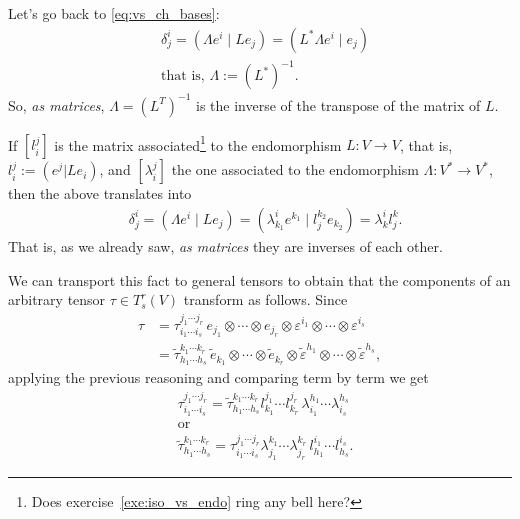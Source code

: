 Let's go back to \eqref{eq:vs_ch_bases}:
\begin{align}
	 & \delta_j^i = (\Lambda e^i \mid L e_j) = (L^* \Lambda e^i \mid e_j) \\
	 & \mbox{that is, } \Lambda := (L^*)^{-1}.
\end{align}
So, \emph{as matrices}, $\Lambda = (L^T)^{-1}$ is the inverse of the transpose of the matrix of $L$.

If $[l_i^j]$ is the matrix associated\footnote{Does exercise~\ref{exe:iso_vs_endo} ring any bell here?} to the endomorphism $L: V \to V$, that is, $l_i^j := (e^j | L e_i)$, and $[\lambda_i^j]$ the one associated to the endomorphism $\Lambda: V^* \to V^*$, then the above translates into
\begin{align}
	 & \delta_j^i = (\Lambda e^i \mid L e_j) = (\lambda_{k_1}^i e^{k_1} \mid l_j^{k_2} e_{k_2}) = \lambda_k^i l_j^k.
\end{align}
That is, as we already saw, \emph{as matrices} they are inverses of each other.

We can transport this fact to general tensors to obtain that the components of an arbitrary tensor $\tau\in T^r_s(V)$ transform as follows.
Since
\begin{align}
	\tau
	 & =
	\tau^{j_1\cdots j_r}_{i_1\cdots i_s} \, e_{j_1}\otimes\cdots\otimes e_{j_r}\otimes \varepsilon^{i_1}\otimes \cdots\otimes \varepsilon^{i_s}                                                           \\
	 & = \widetilde\tau^{k_1\cdots k_r}_{h_1\cdots h_s} \, \widetilde e_{k_1}\otimes\cdots\otimes \widetilde e_{k_r}\otimes \widetilde\varepsilon^{h_1}\otimes \cdots\otimes \widetilde\varepsilon^{h_s},
\end{align}
applying the previous reasoning and comparing term by term we get
\begin{align}
	 & \tau^{j_1\cdots j_r}_{i_1\cdots i_s} = \widetilde\tau^{k_1\cdots k_r}_{h_1\cdots h_s} l_{k_1}^{j_1}\cdots l_{k_r}^{j_r}\, \lambda_{i_1}^{h_1}\cdots \lambda_{i_s}^{h_s}  \\
	 & \mbox{or}                                                                                                                                                                \\
	 & \widetilde\tau^{k_1\cdots k_r}_{h_1\cdots h_s} = \tau^{j_1\cdots j_r}_{i_1\cdots i_s} \lambda_{j_1}^{k_1}\cdots \lambda_{j_r}^{k_r}\, l_{h_1}^{i_1}\cdots l_{h_s}^{i_s}.
\end{align}

